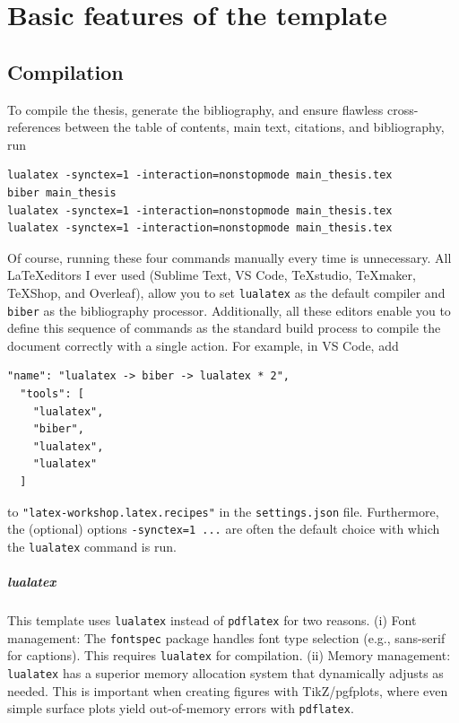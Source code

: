 \graphicspath{{chapters/1_basicfeatures/figures/}}

\chapter{Basic features of the template}
\section{Compilation}
To compile the thesis, generate the bibliography, and ensure flawless cross-references between the table of contents, main text, citations, and bibliography, run
\begin{lstlisting}
lualatex -synctex=1 -interaction=nonstopmode main_thesis.tex
biber main_thesis
lualatex -synctex=1 -interaction=nonstopmode main_thesis.tex
lualatex -synctex=1 -interaction=nonstopmode main_thesis.tex
\end{lstlisting}
Of course, running these four commands manually every time is unnecessary. All \LaTeX editors I ever used (Sublime Text, VS Code, TeXstudio, TeXmaker, TeXShop, and Overleaf), allow you to set \verb|lualatex| as the default compiler and \verb|biber| as the bibliography processor. Additionally, all these editors enable you to define this sequence of commands as the standard build process to compile the document correctly with a single action.
For example, in VS Code, add 
\begin{lstlisting}
"name": "lualatex -> biber -> lualatex * 2",
  "tools": [
    "lualatex",
    "biber",
    "lualatex",
    "lualatex"
  ]
\end{lstlisting}
to \verb|"latex-workshop.latex.recipes"| in the \verb|settings.json| file.
Furthermore, the (optional) options \verb|-synctex=1 ...| are often the default choice with which the \verb|lualatex| command is run.

\paragraph{lualatex} 
This template uses \verb|lualatex| instead of \verb|pdflatex| for two reasons.
(i) Font management: The \verb|fontspec| package handles font type selection (e.g., sans-serif for captions). This requires \verb|lualatex| for compilation.
(ii) Memory management: \verb|lualatex| has a superior memory allocation system that dynamically adjusts as needed. This is important when creating figures with TikZ/pgfplots, where even simple surface plots yield out-of-memory errors with \verb|pdflatex|.

